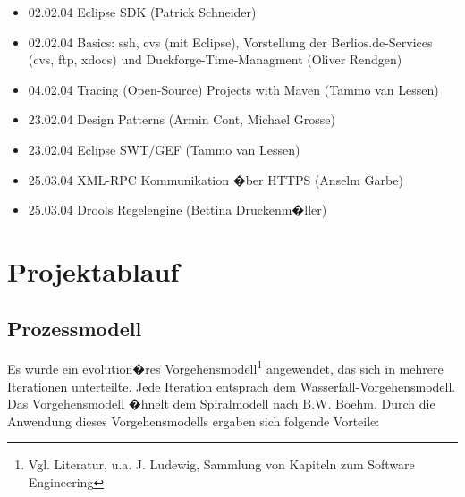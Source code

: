 \documentclass[a4paper,titlepage,12pt,ngerman]{scrbook}
\begin{document}
\begin{itemize}
	\item 02.02.04  Eclipse SDK (Patrick Schneider) 
	\item 02.02.04  Basics: ssh, cvs (mit Eclipse), Vorstellung der Berlios.de-Services 
	(cvs, ftp, xdocs) und Duckforge-Time-Managment (Oliver Rendgen)
	\item 04.02.04  Tracing (Open-Source) Projects with Maven (Tammo van Lessen) 
	\item 23.02.04  Design Patterns (Armin Cont, Michael Grosse)  
	\item 23.02.04  Eclipse SWT/GEF (Tammo van Lessen) 
	\item 25.03.04  XML-RPC Kommunikation �ber HTTPS (Anselm Garbe)  
	\item 25.03.04  Drools Regelengine (Bettina Druckenm�ller)  
\end{itemize}





\chapter{Projektablauf}

\section{Prozessmodell}

Es wurde ein evolution�res Vorgehensmodell\footnote{Vgl. Literatur, u.a. J.
Ludewig, Sammlung von Kapiteln zum Software Engineering} angewendet, das sich
in mehrere Iterationen unterteilte. Jede Iteration entsprach dem
Wasserfall-Vorgehensmodell. Das Vorgehensmodell �hnelt dem Spiralmodell nach
B.W. Boehm.
Durch die Anwendung dieses Vorgehensmodells ergaben sich folgende Vorteile:
\end{document}
